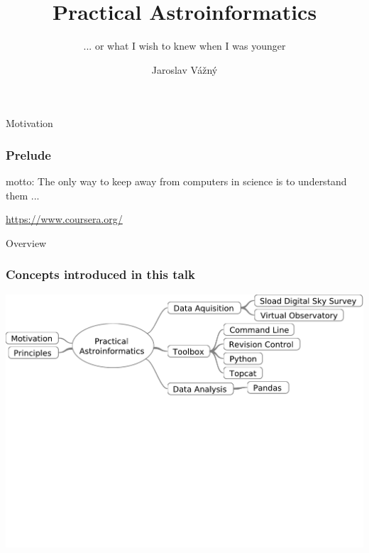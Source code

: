 \documentclass[fleqn]{beamer}
\title[Computers in Science] %
{Practical Astroinformatics}
\subtitle{... or what I wish to knew when I was younger} %
\author[Jaroslav Vážný] %
{Jaroslav Vážný }
\institute[Universities of Somewhere and Elsewhere] %
{

    Masarykova univerzita

}
\begin{document}
 




\begin{frame}
  \titlepage
\end{frame}




\begin{section}{Motivation}     
 \begin{frame}
   \begin{center}
     \frametitle{Prelude}
     \small{motto:  The only way to keep away from computers in
       science is to understand them ... }
   \end{center}

     \vspace{1cm}
    \tiny{ \url{https://www.coursera.org/}}

 \end{frame}
\end{section}


\begin{section}{Overview}
\begin{frame}\frametitle{Concepts introduced in this talk}
  \begin{center}
    \vspace{1cm}
    \includegraphics[width=1.0\textwidth]{overview}    
  \end{center}
\end{frame}
\end{section}
\end{document}
